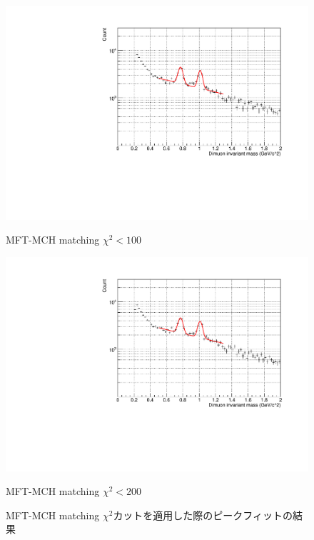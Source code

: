 \begin{figure}[H]
                \begin{minipage}{0.45\textwidth}
                    \centering
                    \includegraphics[width=\textwidth]{fig/3_4_4_Fit_chi2_100.pdf}
                    \caption*{MFT-MCH matching $\chi^2 < 100$}
                \end{minipage}
                \hfill
                \begin{minipage}{0.45\textwidth}
                    \centering
                    \includegraphics[width=\textwidth]{fig/3_4_4_Fit_chi2_200.pdf}
                    \caption*{MFT-MCH matching $\chi^2 < 200$}
                \end{minipage}
                \caption{MFT-MCH matching $\chi^2$カットを適用した際のピークフィットの結果}
                \label{Analysis:Dimuon:Matching_Fit}
            \end{figure}
